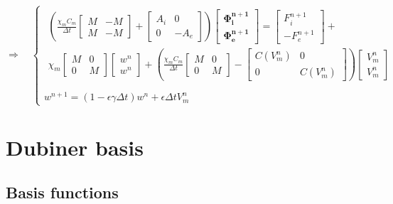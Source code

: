 \documentclass[a4paper]{article}
\begin{document}
\begin{equation}
\Rightarrow \quad 
\begin{cases}
\begin{gathered}
\left(
	\frac{\chi_m C_m}{\Delta t} \begin{bmatrix}M & -M \\ M & -M\end{bmatrix}
	+ \begin{bmatrix} A_i & 0 \\ 0 & -A_e \end{bmatrix}
	\right) \begin{bmatrix} \bm{\Phi_i^{n+1}} \\ \bm{\Phi_e^{n+1}}  \end{bmatrix} =
	\begin{bmatrix} F_i^{n+1} \\ -F_e^{n+1} \end{bmatrix} + \\
	\chi_m\begin{bmatrix} M & 0 \\ 0 & M \end{bmatrix} \begin{bmatrix} w^n \\ w^n \end{bmatrix} +
	\left(\frac{\chi_mC_m}{\Delta t}\begin{bmatrix} M & 0 \\ 0 & M \end{bmatrix}
	- \begin{bmatrix} C(V_m^n) & 0 \\ 0 & C(V_m^n)\end{bmatrix} 
	\right) \begin{bmatrix} V_m^n \\ V_m^n \end {bmatrix}
	 \end{gathered} \\ \\
	w^{n+1} = (1-\epsilon \gamma \Delta t) w^n + \epsilon \Delta tV_m^n
\end{cases}
\end{equation}





\newpage
\section{Dubiner basis} 
\vspace{5mm}
\subsection{Basis functions}
\vspace{4mm}
\end{document}
